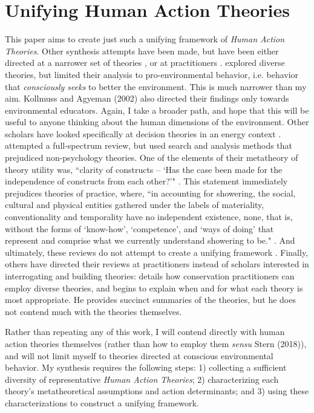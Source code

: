 \documentclass[12 pt]{article}
\begin{document}
\section{Unifying Human Action Theories}
This paper aims to create just such a unifying framework of \textit{Human Action Theories}. Other synthesis attempts have been made, but have been either directed at a narrower set of theories \parencite[e.g.,][]{Kollmuss2002},  or at practitioners \parencite{Stern2018}. \textcite{Kollmuss2002} explored diverse theories, but limited their analysis to pro-environmental behavior, i.e. behavior that \textit{consciously seeks} to better the environment. This is much narrower than my aim. Kollmuss and Agyeman (2002) also directed their findings only towards environmental educators. Again, I take a broader path, and hope that this will be useful to anyone thinking about the human dimensions of the environment.  Other scholars have looked specifically at decision theories in an energy context \parencite{Wilson2007}.  \textcite{Davis2015} attempted a full-spectrum review, but used search and analysis methods that prejudiced  non-psychology theories. One of the elements of their metatheory of theory utility was, ``clarity of constructs – `Has the case been made for the independence of constructs from each other?'" \parencite[][p. 332]{Davis2015}. This statement immediately prejudices theories of practice, where, ``in accounting for showering, the social, cultural and physical entities gathered under the labels of materiality, conventionality and temporality have no independent existence, none, that is, without the forms of `know-how', `competence', and `ways of doing' that represent and comprise what we currently understand showering to be." \parencite[][unpaginated]{Hand2005}. 
And ultimately, these reviews do not attempt to create a unifying framework \parencite{Davis2015}. Finally, others have directed their reviews at practitioners instead of scholars interested in interrogating and building theories:   \textcite{Stern2018} details how conservation practitioners can employ diverse theories, and begins to explain when and for what each theory is most appropriate. He provides succinct summaries of the theories, but he does not contend much with the theories themselves. 

Rather than repeating any of this work, I will contend directly with human action theories themselves (rather than how to employ them \textit{sensu} Stern (2018)), and will not limit myself to theories directed at conscious environmental behavior. My synthesis requires the following steps: 1) collecting a sufficient diversity of representative \textit{Human Action Theories}; 2) characterizing each theory's metatheoretical assumptions and action determinants; and 3) using these characterizations to construct a unifying framework. 
\end{document}
